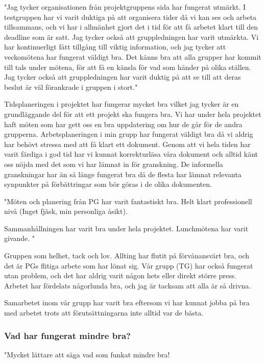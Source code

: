 \documentclass[a4paper]{article}
\begin{document}
"Jag tycker organisationen från projektgruppens sida har fungerat utmärkt. I testgruppen har vi varit duktiga på att organisera tider då vi kan ses och arbeta tillsammans, och vi har i allmänhet gjort det i tid för att få arbetet klart till den deadline som är satt.
Jag tycker också att gruppledningen har varit utmärkta. Vi har kontinuerligt fått tillgång till viktig information, och jag tycker att veckomötena har fungerat väldigt bra. Det känns bra att alla grupper har kommit till tals under mötena, för att få en känsla för vad som händer på olika ställen. Jag tycker också att gruppledningen har varit duktig på att se till att deras beslut är väl förankrade i gruppen i stort."

Tidsplaneringen i projektet har fungerar mycket bra vilket jag tycker är en grundläggande del för att ett projekt ska fungera bra. Vi har under hela projektet haft möten som har gett oss en bra uppdatering om hur de går för de andra grupperna. Arbetsplaneringen i min grupp har fungerat väldigt bra då vi aldrig har behövt stressa med att få klart ett dokument. Genom att vi hela tiden har varit färdiga i god tid har vi kunnat korrekturläsa våra dokument och alltid känt oss nöjda med det som vi har lämnat in för granskning. De informella granskningar har än så länge fungerat bra då de flesta har lämnat relevanta synpunkter på förbättringar som bör göras i de olika dokumenten.

"Möten och planering från PG har varit fantastiskt bra. Helt klart professionell nivå (Inget fjäsk, min personliga åsikt). 

Sammanhållningen har varit bra under hela projektet. Lunchmötena har varit givande. "

Gruppen som helhet, tack och lov. Allting har flutit på förvånansvärt bra, och det är PGs flitiga arbete som har lönat sig. Vår grupp (TG) har också fungerat utan problem, och det har aldrig varit någon hets eller direkt större press. Arbetet har fördelats någorlunda bra, och jag är tacksam att alla är så drivna. 

Samarbetet inom vår grupp har varit bra eftersom vi har kunnat  jobba på bra med arbetet trots att förutsättningarna inte alltid var de bästa.

\subsubsection{Vad har fungerat mindre bra?}
"Mycket lättare att säga vad som funkat mindre bra!
\end{document}
